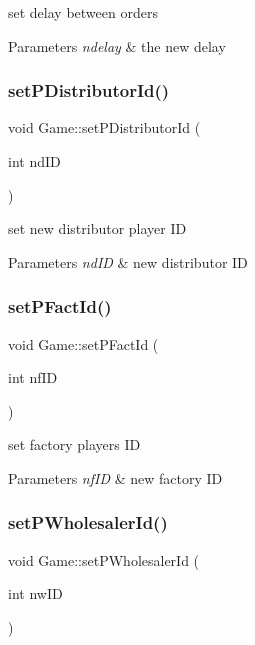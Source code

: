 set delay between orders 
\begin{DoxyParams}{Parameters}
{\em ndelay} & the new delay \\
\hline
\end{DoxyParams}
\mbox{\label{classGame_ad42bbcafead378b6fa33110dadf4c67b}} 
\subsubsection{\texorpdfstring{set\+P\+Distributor\+Id()}{setPDistributorId()}}
{\footnotesize\ttfamily void Game\+::set\+P\+Distributor\+Id (\begin{DoxyParamCaption}\item[{int}]{nd\+ID }\end{DoxyParamCaption})}

set new distributor player ID 
\begin{DoxyParams}{Parameters}
{\em nd\+ID} & new distributor ID \\
\hline
\end{DoxyParams}
\mbox{\label{classGame_a13be14dc30d9abffe0aecad59977dcdc}} 
\subsubsection{\texorpdfstring{set\+P\+Fact\+Id()}{setPFactId()}}
{\footnotesize\ttfamily void Game\+::set\+P\+Fact\+Id (\begin{DoxyParamCaption}\item[{int}]{nf\+ID }\end{DoxyParamCaption})}

set factory player\textquotesingle{}s ID 
\begin{DoxyParams}{Parameters}
{\em nf\+ID} & new factory ID \\
\hline
\end{DoxyParams}
\mbox{\label{classGame_a6cfdb34ff66e98c193dfc918a961ce66}} 
\subsubsection{\texorpdfstring{set\+P\+Wholesaler\+Id()}{setPWholesalerId()}}
{\footnotesize\ttfamily void Game\+::set\+P\+Wholesaler\+Id (\begin{DoxyParamCaption}\item[{int}]{nw\+ID }\end{DoxyParamCaption})}

